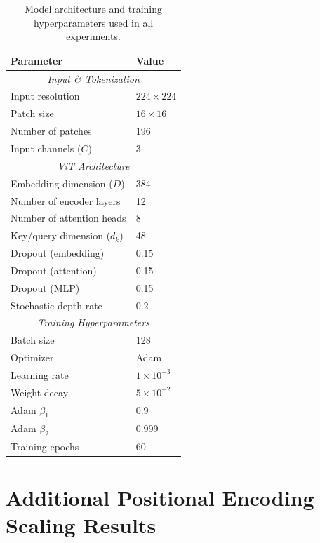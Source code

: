 \documentclass{article}
\begin{document}
  \begin{table}[H]
    \centering
    \caption{Model architecture and training hyperparameters used in all experiments.}
    \label{tab:hyperparams}
    \begin{tabular}{l l}
    \toprule
    \textbf{Parameter} & \textbf{Value} \\
    \midrule
    \multicolumn{2}{c}{\textit{Input \& Tokenization}} \\
    \midrule
    Input resolution & $224 \times 224$ \\
    Patch size & $16 \times 16$ \\
    Number of patches & 196 \\
    Input channels ($C$) & 3 \\
    \midrule
    \multicolumn{2}{c}{\textit{ViT Architecture}} \\
    \midrule
    Embedding dimension ($D$) & 384 \\
    Number of encoder layers & 12 \\
    Number of attention heads & 8 \\
    Key/query dimension ($d_k$) & 48 \\
    Dropout (embedding) & 0.15 \\
    Dropout (attention) & 0.15 \\
    Dropout (MLP) & 0.15 \\
    Stochastic depth rate & 0.2 \\
    \midrule
    \multicolumn{2}{c}{\textit{Training Hyperparameters}} \\
    \midrule
    Batch size & 128 \\
    Optimizer & Adam \\
    Learning rate & $1 \times 10^{-3}$ \\
    Weight decay & $5 \times 10^{-2}$ \\
    Adam $\beta_1$ & 0.9 \\
    Adam $\beta_2$ & 0.999 \\
    Training epochs & 60 \\
    \bottomrule
    \end{tabular}
    \end{table}

\section{Additional Positional Encoding Scaling Results}
\end{document}
